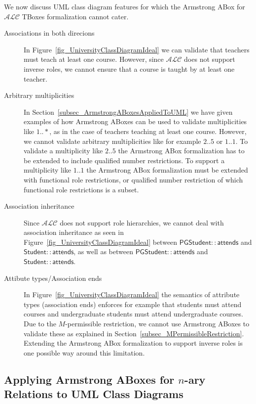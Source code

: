 \documentclass{amsart}
\begin{document}
 We now discuss UML class diagram features for which the Armstrong ABox for $\mathcal{ALC}$ TBoxes formalization cannot cater.
  \begin{description}
  	\item[Associations in both direcions] In Figure~\ref{fig_UniversityClassDiagramIdeal} we can validate that teachers must teach at least one course. However, since $\mathcal{ALC}$ does not support inverse roles, we cannot ensure that a course is taught by at least one teacher. 
 	\item[Arbitrary multiplicities] In Section~\ref{subsec_ArmstrongABoxesAppliedToUML} we have given examples of how Armstrong ABoxes can be used to validate multiplicities like $1..*$, as in the case of teachers teaching at least one course. However, we cannot validate arbitrary multiplicities like for example $2..5$ or $1..1$. To validate a multiplicity like $2..5$ the Armstrong ABox formalization has to be extended to include qualified number restrictions. To support a multiplicity like $1..1$ the Armstrong ABox formalization must be extended with functional role restrictions, or qualified number restriction of which functional role restrictions is a subset.
 	\item[Association inheritance] Since $\mathcal{ALC}$ does not support role hierarchies, we cannot deal with association inheritance as seen in Figure~\ref{fig_UniversityClassDiagramIdeal} between $\mathsf{PGStudent::attends}$ and $\mathsf{Student::attends}$, as well as between $\mathsf{PGStudent::attends}$ and $\mathsf{Student::attends}$.
 	\item[Attibute types/Association ends] In Figure~\ref{fig_UniversityClassDiagramIdeal} the semantics of attribute types (association ends) enforces for example that students must attend courses and undergraduate students must attend undergraduate courses. Due to the $M$-permissible restriction, we cannot use Armstrong ABoxes to validate these as explained in Section~\ref{subsec_MPermissibleRestriction}. Extending the Armstrong ABox formalization to support inverse roles is one possible way around this limitation.
 \end{description} 

 \subsection{Applying Armstrong ABoxes for $n$-ary Relations to UML Class Diagrams}
    
   
   
        
 
  
  
 
\end{document}
